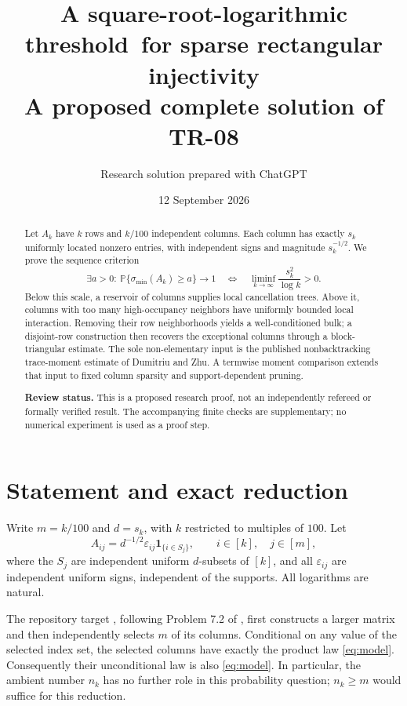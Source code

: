 \documentclass[11pt]{article}
\title{A square-root-logarithmic threshold\ for sparse rectangular injectivity\\[5pt]
  \large A proposed complete solution of TR-08}
\author{Research solution prepared with ChatGPT}
\date{12 September 2026}
\theoremstyle{definition}
\theoremstyle{remark}
\newcommand{\PP}{\mathbb P}
\newcommand{\smin}{\sigma_{\min}}
\newcommand{\ind}{\mathbf 1}
\begin{document}
\maketitle
\begin{abstract}
Let $A_k$ have $k$ rows and $k/100$ independent columns. Each column has exactly $s_k$ uniformly located nonzero entries, with independent signs and magnitude $s_k^{-1/2}$. We prove the sequence criterion
\[
 \exists a>0:\ \PP\{\smin(A_k)\geq a\}\longrightarrow1
 \quad\Longleftrightarrow\quad
 \liminf_{k\to\infty}\frac{s_k^2}{\log k}>0.
\]
Below this scale, a reservoir of columns supplies local cancellation trees. Above it, columns with too many high-occupancy neighbors have uniformly bounded local interaction. Removing their row neighborhoods yields a well-conditioned bulk; a disjoint-row construction then recovers the exceptional columns through a block-triangular estimate. The sole non-elementary input is the published nonbacktracking trace-moment estimate of Dumitriu and Zhu. A termwise moment comparison extends that input to fixed column sparsity and support-dependent pruning.

\smallskip
\noindent\textbf{Review status.} This is a proposed research proof, not an independently refereed or formally verified result. The accompanying finite checks are supplementary; no numerical experiment is used as a proof step.
\end{abstract}

\section{Statement and exact reduction}

Write $m=k/100$ and $d=s_k$, with $k$ restricted to multiples of $100$. Let
\begin{equation}\label{eq:model}
 A_{ij}=d^{-1/2}\varepsilon_{ij}\ind_{\{i\in S_j\}},
 \qquad i\in[k],\quad j\in[m],
\end{equation}
where the $S_j$ are independent uniform $d$-subsets of $[k]$, and all $\varepsilon_{ij}$ are independent uniform signs, independent of the supports. All logarithms are natural.

The repository target \cite{TR08}, following Problem 7.2 of \cite{HRT}, first constructs a larger matrix and then independently selects $m$ of its columns. Conditional on any value of the selected index set, the selected columns have exactly the product law \eqref{eq:model}. Consequently their unconditional law is also \eqref{eq:model}. In particular, the ambient number $n_k$ has no further role in this probability question; $n_k\geq m$ would suffice for this reduction.
\end{document}
